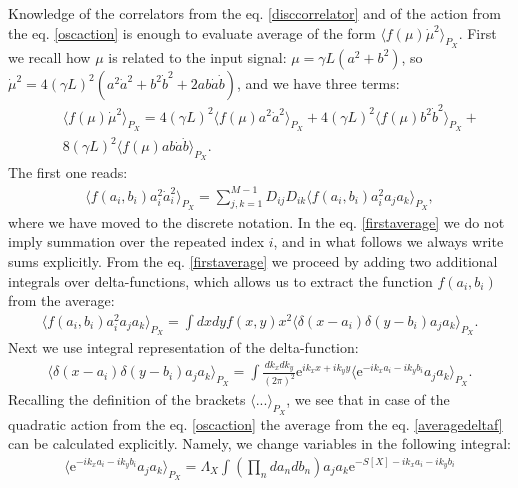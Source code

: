\documentclass{article}
\begin{document}
Knowledge of the correlators from the eq$.$ \eqref{disccorrelator} and of the action from the eq$.$ \eqref{oscaction} is enough to evaluate average of the form $\langle f(\mu) \dot{\mu}^{2}\rangle_{P_{X}}$. First we recall how $\mu$ is related to the input signal: $\mu = \gamma L (a^{2}+b^{2})$, so $\dot{\mu}^{2} = 4(\gamma L)^{2}(a^{2}\dot{a}^{2}+b^{2}\dot{b}^{2}+2a b \dot{a}\dot{b})$, and we have three terms:
\begin{eqnarray}
    &&\langle f(\mu)\dot{\mu}^{2} \rangle_{P_{X}} = 4(\gamma L)^{2}\langle f(\mu) a^{2}\dot{a}^{2} \rangle_{P_{X}} + 4(\gamma L)^{2}\langle f(\mu) b^{2}\dot{b}^{2} \rangle_{P_{X}} + \nonumber\\
    &&8(\gamma L)^{2}\langle f(\mu) a b\dot{a}\dot{b} \rangle_{P_{X}}.
\end{eqnarray}
The first one reads: 
\begin{eqnarray}\label{firstaverage}
    \langle f(a_{i},b_{i})a_{i}^{2}\dot{a}_{i}^{2}\rangle_{P_{X}} = \sum_{j,k=1}^{M-1} D_{ij}D_{ik} \langle f(a_{i},b_{i})a_{i}^{2}a_{j}a_{k}\rangle_{P_{X}},
\end{eqnarray}
where we have moved to the discrete notation. In the eq$.$ \eqref{firstaverage} we do not imply summation over the repeated index $i$, and in what follows we always write sums explicitly. From the eq$.$ \eqref{firstaverage} we proceed by adding two additional integrals over delta-functions, which allows us to extract the function $f(a_{i},b_{i})$ from the average:
\begin{eqnarray}\label{firstaveragenoD}
    \langle f(a_{i},b_{i})a_{i}^{2}a_{j}a_{k}\rangle_{P_{X}} = \int dx dy f(x,y)x^{2}\langle \delta(x-a_{i})\delta(y-b_{i})a_{j}a_{k}\rangle_{P_{X}}.
\end{eqnarray}
Next we use integral representation of the delta-function:
\begin{eqnarray}\label{averagedeltaf}
    \langle \delta(x-a_{i})\delta(y-b_{i})a_{j}a_{k}\rangle_{P_{X}} = \int \frac{dk_{x}dk_{y}}{(2\pi)^{2}} \textrm{e}^{ik_{x}x+ik_{y}y}\langle \textrm{e}^{-ik_{x}a_{i}-ik_{y}b_{i}}a_{j}a_{k} \rangle_{P_{X}}.
\end{eqnarray}
Recalling the definition of the brackets $\langle ... \rangle_{P_{X}}$, we see that in case of the quadratic action from the eq$.$ \eqref{oscaction} the average from the eq$.$ \eqref{averagedeltaf} can be calculated explicitly. Namely, we change variables in the following integral: 
\begin{eqnarray}\label{oldintegral}
    \langle \textrm{e}^{-ik_{x}a_{i}-ik_{y}b_{i}}a_{j}a_{k} \rangle_{P_{X}} =\Lambda_{X} \int \left(\prod_{n} da_{n}db_{n}\right)  a_{j} a_{k} \textrm{e}^{-S[X]-ik_{x}a_{i}-ik_{y}b_{i}}
\end{eqnarray}
\end{document}
